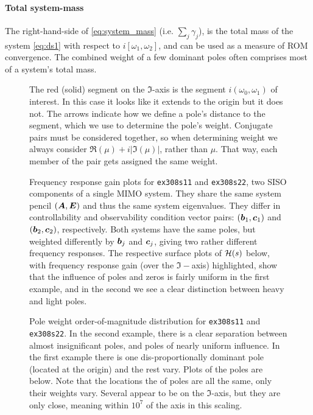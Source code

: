 \paragraph{Total system-mass}
The right-hand-side of \eqref{eq:system_mass} (i.e. $\sum_j \gamma_j$),
 is the total mass of the system \eqref{eq:ds1} with respect to $ i[\omega_1,\omega_2]$, and can be used as a measure of ROM convergence.  The combined weight of a few dominant poles often comprises most of a system's total mass.

\begin{figure}
\centering
{}
\caption{\label{fig:MDI_examp} The red (solid) segment on the $\Im$-axis is the segment $i(\omega_0, \omega_1)$ of interest.  In this case it looks like it extends to the origin but it does not.  The arrows indicate how we define a pole's distance to the segment, which we use to determine the pole's weight. Conjugate pairs must be considered together, so when determining weight we always consider $\Re(\mu)+ i|\Im(\mu) |$, rather than $\mu$. That way, each member of the pair gets assigned the same weight.}
\end{figure}







\begin{figure}[htb]
\centering
{}\hfill
{}
\caption{\label{fig:30812tfuncs}Frequency response gain plots for \texttt{ex308s11} and \texttt{ex308s22}, two SISO components of a single MIMO system.   They  share the same system pencil $(\bm{A},\bm{E})$ and thus the same system eigenvalues.  They differ in controllability and observability condition vector pairs:  $(\bm{b}_1,\bm{c}_1)$ and $(\bm{b}_2,\bm{c}_2)$, respectively.  Both systems have the same poles, but weighted differently by $\bm{b}_j$ and $\bm{c}_j$, giving two rather different frequency responses.  The respective surface plots of $\mathcal{H}(s)$ below, with frequency response gain (over the $\Im-$axis) highlighted, show that the influence of poles and zeros is fairly uniform in the first example, and in the second we see a clear distinction between heavy and light poles. }
\label{fig:examps308s12}
\hfill
{}
\end{figure}

\begin{figure}[htb]
\centering
{}
\caption{Pole weight order-of-magnitude distribution for \texttt{ex308s11} and \texttt{ex308s22}.  In the second example, there is a clear separation between almost insignificant poles, and poles of nearly uniform influence.  In the first example there is one dis-proportionally dominant pole (located at the origin) and the rest vary.  Plots of the poles are below.  Note that the locations the of poles are all the same, only their weights vary.  Several appear to be on the $\Im$-axis, but they are only close, meaning within $10^7$ of the axis in this scaling.}
\end{figure}



